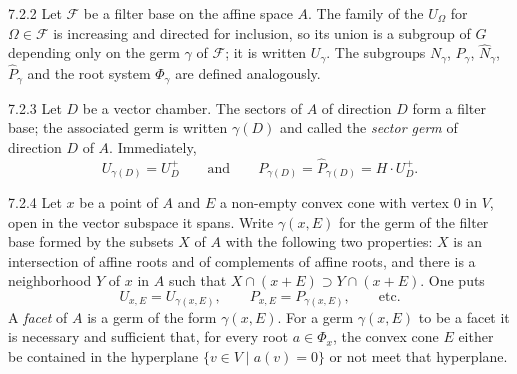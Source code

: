 \documentclass[12pt,a4paper,oneside,english]{smfart}
\theoremstyle{definition}
\theoremstyle{bt}
\begin{document}
\begin{btpar}{7.2.2}
Let $\mathscr{F}$ be a filter base on the affine space $A$. The family of
the $U_\Omega$ for $\Omega\in\mathscr{F}$ is increasing and directed for
inclusion, so its union is a subgroup of $G$ depending only on the germ
$\gamma$ of $\mathscr{F}$; it is written $U_\gamma$. The subgroups
$N_\gamma$, $P_\gamma$, $\widehat{N}_\gamma$, $\widehat{P}_\gamma$ and
the root system $\Phi_\gamma$ are defined analogously.
\end{btpar}

\begin{btpar}{7.2.3}
Let $D$ be a vector chamber. The sectors of $A$ of direction $D$ form a
filter base; the associated germ is written $\gamma(D)$ and called the
\emph{sector germ} of direction $D$ of $A$. Immediately,
\[
  U_{\gamma(D)}=U^{+}_{D}
  \qquad\text{and}\qquad
  P_{\gamma(D)}=\widehat{P}_{\gamma(D)}=H\cdot U^{+}_{D}.
\]
\end{btpar}

\begin{btpar}{7.2.4}
Let $x$ be a point of $A$ and $E$ a non-empty convex cone with vertex $0$
in $V$, open in the vector subspace it spans. Write $\gamma(x,E)$ for the
germ of the filter base formed by the subsets $X$ of $A$ with the
following two properties: $X$ is an intersection of affine roots and of
complements of affine roots, and there is a neighborhood $Y$ of $x$ in
$A$ such that $X\cap(x+E)\supset Y\cap(x+E)$. One puts
\[
  U_{x,E}=U_{\gamma(x,E)},\qquad P_{x,E}=P_{\gamma(x,E)},\qquad\text{etc.}
\]
A \emph{facet} of $A$ is a germ of the form $\gamma(x,E)$. For a germ $\gamma(x,E)$ to be a facet
it is necessary and sufficient that, for every root $a\in\Phi_x$, the
convex cone $E$ either be contained in the hyperplane
$\{v\in V\mid a(v)=0\}$ or not meet that hyperplane.
\end{btpar}
\end{document}

